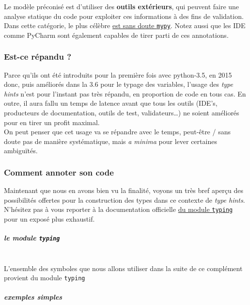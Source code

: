     Le modèle préconisé est d'utiliser des \textbf{outils extérieurs}, qui
peuvent faire une analyse statique du code pour exploiter ces
informations à des fins de validation. Dans cette catégorie, le plus
célèbre \href{http://mypy-lang.org/}{est sans doute \texttt{mypy}}.
Notez aussi que les IDE comme PyCharm sont également capables de tirer
parti de ces annotations.

    \hypertarget{est-ce-ruxe9pandu}{%
\subsubsection{Est-ce répandu ?}\label{est-ce-ruxe9pandu}}

    Parce qu'ils ont été introduits pour la première fois avec python-3.5,
en 2015 donc, puis améliorés dans la 3.6 pour le typage des variables,
l'usage des \emph{type hints} n'est pour l'instant pas très répandu, en
proportion de code en tous cas. En outre, il aura fallu un temps de
latence avant que tous les outils (IDE's, producteurs de documentation,
outils de test, validateurs\ldots{}) ne soient améliorés pour en tirer
un profit maximal.\\

On peut penser que cet usage va se répandre avec le temps, peut-être /
sans doute pas de manière systématique, mais \emph{a minima} pour lever
certaines ambiguïtés.

    \hypertarget{comment-annoter-son-code}{%
\subsubsection{Comment annoter son
code}\label{comment-annoter-son-code}}

    Maintenant que nous en avons bien vu la finalité, voyons un très bref
aperçu des possibilités offertes pour la construction des types dans ce
contexte de \emph{type hints}. N'hésitez pas à vous reporter à la
documentation officielle
\href{https://docs.python.org/3/library/typing.html}{du module
\texttt{typing}} pour un exposé plus exhaustif.

    \hypertarget{le-module-typing}{%
\subparagraph{\texorpdfstring{le module
\texttt{typing}}{le module typing}\\\\}\label{le-module-typing}}

    L'ensemble des symboles que nous allons utiliser dans la suite de ce
complément provient du module \texttt{typing}

    \hypertarget{exemples-simples}{%
\subparagraph{exemples simples}\label{exemples-simples}}


